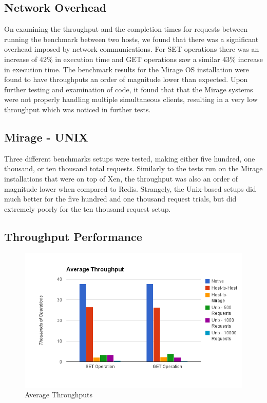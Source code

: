 \documentclass[english,10pt,twocolumn]{article}
\begin{document}
\subsection{Network Overhead}

On examining the throughput and the completion times for requests between running the benchmark between two hosts, we found that there was a significant overhead imposed by network communications. For SET operations there was an increase of 42\% in execution time and GET operations saw a similar 43\% increase in execution time.
The benchmark results for the Mirage OS installation were found to have throughputs an order of magnitude lower than expected.
Upon further testing and examination of code, it found that that the Mirage systems were not properly handling multiple simultaneous clients, resulting in a very low throughput which was noticed in further tests.


\subsection{Mirage - UNIX}

Three different benchmarks setups were tested, making either five hundred, one thousand, or ten thousand total requests.
Similarly to the tests run on the Mirage installations that were on top of Xen, the throughput was also an order of magnitude lower when compared to Redis. 
Strangely, the Unix-based setups did much better for the five hundred and one thousand request trials, but did extremely poorly for the ten thousand request setup.

\subsection{Throughput Performance}

\begin{figure}[ht]
  \centering
  \caption{Average Throughputs}
  \includegraphics[width=1.0\textwidth]{images/throughput}
\end{figure}
\end{document}
